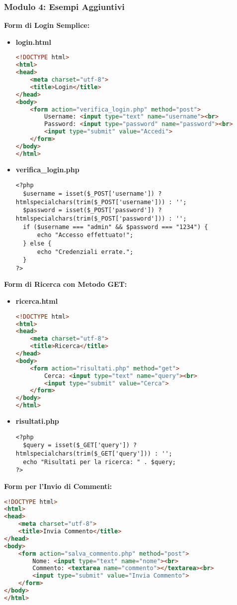 \documentclass{beamer}
\begin{document}
\begin{frame}[fragile]
\frametitle{Modulo 4: Esempi Aggiuntivi}
\textbf{Form di Login Semplice:}
\begin{itemize}
    \item \textbf{login.html}
    \begin{lstlisting}[language=HTML]
<!DOCTYPE html>
<html>
<head>
    <meta charset="utf-8">
    <title>Login</title>
</head>
<body>
    <form action="verifica_login.php" method="post">
        Username: <input type="text" name="username"><br>
        Password: <input type="password" name="password"><br>
        <input type="submit" value="Accedi">
    </form>
</body>
</html>
    \end{lstlisting}
    \item \textbf{verifica_login.php}
    \begin{lstlisting}
<?php
  $username = isset($_POST['username']) ? htmlspecialchars(trim($_POST['username'])) : '';
  $password = isset($_POST['password']) ? htmlspecialchars(trim($_POST['password'])) : '';
  if ($username === "admin" && $password === "1234") {
      echo "Accesso effettuato!";
  } else {
      echo "Credenziali errate.";
  }
?>
    \end{lstlisting}
\end{itemize}
\vspace{0.5em}
\textbf{Form di Ricerca con Metodo GET:}
\begin{itemize}
    \item \textbf{ricerca.html}
    \begin{lstlisting}[language=HTML]
<!DOCTYPE html>
<html>
<head>
    <meta charset="utf-8">
    <title>Ricerca</title>
</head>
<body>
    <form action="risultati.php" method="get">
        Cerca: <input type="text" name="query"><br>
        <input type="submit" value="Cerca">
    </form>
</body>
</html>
    \end{lstlisting}
    \item \textbf{risultati.php}
    \begin{lstlisting}
<?php
  $query = isset($_GET['query']) ? htmlspecialchars(trim($_GET['query'])) : '';
  echo "Risultati per la ricerca: " . $query;
?>
    \end{lstlisting}
\end{itemize}
\vspace{0.5em}
\textbf{Form per l'Invio di Commenti:}
\begin{lstlisting}[language=HTML]
<!DOCTYPE html>
<html>
<head>
    <meta charset="utf-8">
    <title>Invia Commento</title>
</head>
<body>
    <form action="salva_commento.php" method="post">
        Nome: <input type="text" name="nome"><br>
        Commento: <textarea name="commento"></textarea><br>
        <input type="submit" value="Invia Commento">
    </form>
</body>
</html>
\end{lstlisting}
\end{frame}
\end{document}
